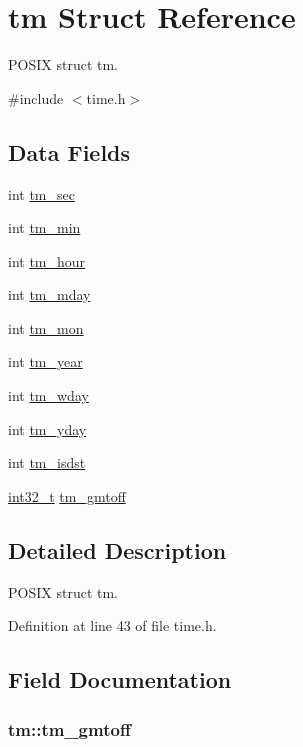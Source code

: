 \hypertarget{structtm}{\section{tm Struct Reference}
\label{structtm}
}


P\-O\-S\-I\-X struct tm.  




{\ttfamily \#include $<$time.\-h$>$}

\subsection*{Data Fields}
\begin{DoxyCompactItemize}
\item 
int \hyperlink{structtm_a4d098a9a5c03a00b2ee61e10851de81e}{tm\-\_\-sec}
\item 
int \hyperlink{structtm_af414eb7c86cc3099595211eee4d4211b}{tm\-\_\-min}
\item 
int \hyperlink{structtm_a3e7ca4e37f1abcaf56b8a916c38eb9fe}{tm\-\_\-hour}
\item 
int \hyperlink{structtm_ab8d8904bad43b0c8b96e61941c5b5310}{tm\-\_\-mday}
\item 
int \hyperlink{structtm_a112ac36fa2f593777138a417cf031e17}{tm\-\_\-mon}
\item 
int \hyperlink{structtm_a33adf78fd6476b2120ce3b9c4a852053}{tm\-\_\-year}
\item 
int \hyperlink{structtm_afe81a8c46f1c693c43f259b288859f4f}{tm\-\_\-wday}
\item 
int \hyperlink{structtm_a93a0ba77cc23796df84405dcbcc57eb1}{tm\-\_\-yday}
\item 
int \hyperlink{structtm_a5645ca0580c8ab2c24f6c2965d9c9f9c}{tm\-\_\-isdst}
\item 
\hyperlink{earth2wireframe_8c_a32f2e37ee053cf2ce8ca28d1f74630e5}{int32\-\_\-t} \hyperlink{structtm_a6b7d1fb16f21197ea027e364e2812c3d}{tm\-\_\-gmtoff}
\end{DoxyCompactItemize}


\subsection{Detailed Description}
P\-O\-S\-I\-X struct tm. 

Definition at line 43 of file time.\-h.



\subsection{Field Documentation}
\hypertarget{structtm_a6b7d1fb16f21197ea027e364e2812c3d}{
\subsubsection[{tm\-\_\-gmtoff}]{ tm\-::tm\-\_\-gmtoff}}\label{structtm_a6b7d1fb16f21197ea027e364e2812c3d}


